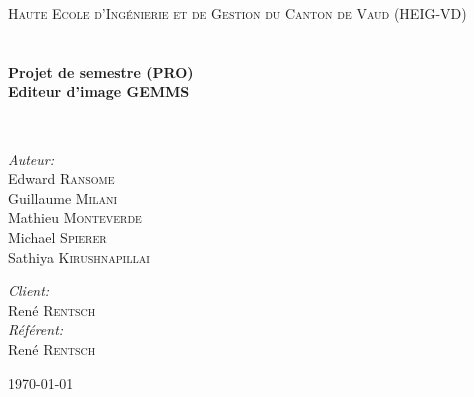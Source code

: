 \begin{titlepage}
    \begin{center}
        
        \textsc{\LARGE Haute Ecole d'Ingénierie et de Gestion du Canton de Vaud (HEIG-VD)}\\[1.5cm]
        
        \textsc{\Large }\\[0.5cm]
        
        \HRule \\[0.4cm]
        
        {\huge \bfseries Projet de semestre (PRO)\\
            Editeur d'image GEMMS \\[0.4cm] }
        
        \HRule \\[1.5cm]
        
        \begin{minipage}{0.4\textwidth}
            \begin{flushleft} \large
                \emph{Auteur:}\\
                Edward \textsc{Ransome}\\
                Guillaume \textsc{Milani}\\
                Mathieu \textsc{Monteverde}\\
                Michael \textsc{Spierer}\\
                Sathiya \textsc{Kirushnapillai}
            \end{flushleft}
        \end{minipage}
        \begin{minipage}{0.4\textwidth}
            \begin{flushright} \large
                \emph{Client:} \\
                René \textsc{Rentsch}\\
                \emph{Référent:} \\
                René \textsc{Rentsch}\\
            \end{flushright}
        \end{minipage}
        
        \vfill
        
        {\large \today}
        
    \end{center}
\end{titlepage}
